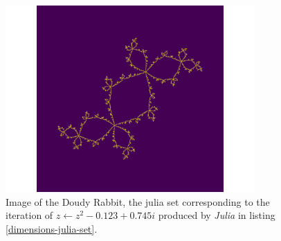 \documentclass[a4paper,11pt,twoside]{article}
\begin{document}
\begin{figure}[htbp]
\centering
\includegraphics[width=0.85\textwidth]{media/outline-rabbit.png}
\caption{\label{fig:julia-rab}Image of the Doudy Rabbit, the julia set corresponding to the iteration of \(z \leftarrow z^{2} -0.123+0.745i\) produced by \emph{Julia} in listing \ref{dimensions-julia-set}.}
\end{figure}
\end{document}

